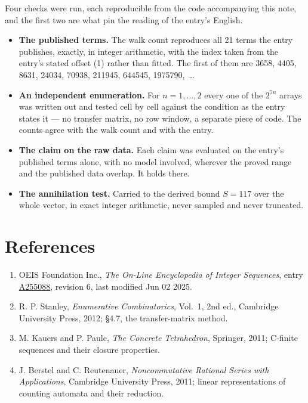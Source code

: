 \documentclass[11pt]{article}
\theoremstyle{definition}
\begin{document}
Four checks were run, each reproducible from the code accompanying this note, and the first two are what pin the reading of the entry's English.

\begin{itemize}

\item {\bfseries The published terms.} The walk count reproduces all 21 terms the entry publishes, exactly, in integer arithmetic, with the index taken from the entry's stated offset (1) rather than fitted. The first of them are 3658, 4405, 8631, 24034, 70938, 211945, 644545, 1975790,~\dots

\item {\bfseries An independent enumeration.} For $n = 1,\dots,2$ every one of the $2^{7n}$ arrays was written out and tested cell by cell against the condition as the entry states it --- no transfer matrix, no row window, a separate piece of code. The counts agree with the walk count and with the entry.

\item {\bfseries The claim on the raw data.} Each claim was evaluated on the entry's published terms alone, with no model involved, wherever the proved range and the published data overlap. It holds there.

\item {\bfseries The annihilation test.} Carried to the derived bound $S = 117$ over the whole vector, in exact integer arithmetic, never sampled and never truncated.

\end{itemize}

\section{References}

\begin{enumerate}

\item OEIS Foundation Inc., \emph{The On-Line Encyclopedia of Integer Sequences}, entry \href{https://oeis.org/A255088}{A255088}, revision 6, last modified Jun 02 2025.

\item R. P. Stanley, \emph{Enumerative Combinatorics}, Vol.~1, 2nd ed., Cambridge University Press, 2012; \S4.7, the transfer-matrix method.

\item M. Kauers and P. Paule, \emph{The Concrete Tetrahedron}, Springer, 2011; C-finite sequences and their closure properties.

\item J. Berstel and C. Reutenauer, \emph{Noncommutative Rational Series with Applications}, Cambridge University Press, 2011; linear representations of counting automata and their reduction.

\end{enumerate}
\end{document}
